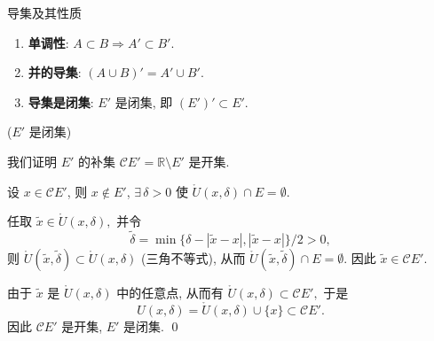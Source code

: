 \begin{frame}{导集及其性质}

\begin{prop}[导集的性质]
\begin{enumerate}
\item \textbf{单调性}: $A \subset B \Rightarrow A' \subset B'.$
\item \textbf{并的导集}: $(A \cup B)' = A' \cup B'.$
\item \textbf{导集是闭集}: $E'$ 是闭集, 即 $(E')' \subset E'.$
\end{enumerate}
\end{prop}

\pause
\vspace{0.5em}

\startproof[bg=yellow, fg=red]($E'$ 是闭集)
\vspace{0.3em}

我们证明 $E'$ 的补集 $\mathscr{C} E' = \mathbb{R} \setminus E'$ 是开集.

\pause
\vspace{0.5em}

设 $x \in \mathscr{C} E'$, 则 $x \notin E'$, $\exists\, \delta > 0$ 使 $\mathring{U}(x, \delta) \cap E = \emptyset.$

\pause
\vspace{0.3em}

任取 $\widetilde{x} \in \mathring{U}(x, \delta),$ 并令
\[
\widetilde{\delta} = \min\{\delta - |\widetilde{x} - x|, |\widetilde{x} - x|\} / 2 > 0,
\]
则 $\mathring{U}(\widetilde{x}, \widetilde{\delta}) \subset \mathring{U}(x, \delta)$ (三角不等式), 从而 $\mathring{U}(\widetilde{x}, \widetilde{\delta}) \cap E = \emptyset.$ 因此 $\widetilde{x} \in \mathscr{C} E'.$

\pause
\vspace{0.3em}

由于 $\widetilde{x}$ 是 $\mathring{U}(x, \delta)$ 中的任意点, 从而有 $\mathring{U}(x, \delta) \subset \mathscr{C} E',$ 于是
\[
U(x, \delta) = \mathring{U}(x, \delta) \cup \{x\} \subset \mathscr{C} E'.
\]
因此 $\mathscr{C} E'$ 是开集, $E'$ 是闭集.
\qed

\end{frame}


